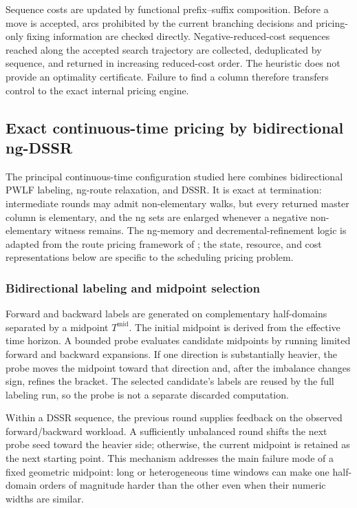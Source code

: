 Sequence costs are updated by functional prefix--suffix composition. Before a move
is accepted, arcs prohibited by the current branching decisions and pricing-only
fixing information are checked directly. Negative-reduced-cost sequences reached
along the accepted search trajectory are collected, deduplicated by sequence, and
returned in increasing reduced-cost order. The heuristic does not provide an
optimality certificate. Failure to find a column therefore transfers control to
the exact internal pricing engine.

\subsection{Exact continuous-time pricing by bidirectional ng-DSSR}
\label{subsec:ng-dssr}

The principal continuous-time configuration studied here combines bidirectional PWLF
labeling, ng-route relaxation, and DSSR. It is exact at termination: intermediate
rounds may admit non-elementary walks, but every returned master column is
elementary, and the ng sets are enlarged whenever a negative non-elementary witness
remains. The ng-memory and decremental-refinement logic is adapted from the route
pricing framework of \citet{martinelli2014pricing}; the state, resource, and cost
representations below are specific to the scheduling pricing problem.

\subsubsection{Bidirectional labeling and midpoint selection}

Forward and backward labels are generated on complementary half-domains separated
by a midpoint $T^{\mathrm{mid}}$. The initial midpoint is derived from the effective
time horizon. A bounded probe evaluates candidate midpoints by running limited
forward and backward expansions. If one direction is substantially heavier, the
probe moves the midpoint toward that direction and, after the imbalance changes
sign, refines the bracket. The selected candidate's labels are reused by the full
labeling run, so the probe is not a separate discarded computation.

Within a DSSR sequence, the previous round supplies feedback on the observed
forward/backward workload. A sufficiently unbalanced round shifts the next probe
seed toward the heavier side; otherwise, the current midpoint is retained as the
next starting point. This mechanism addresses the main failure mode of a fixed
geometric midpoint: long or heterogeneous time windows can make one half-domain
orders of magnitude harder than the other even when their numeric widths are
similar.

